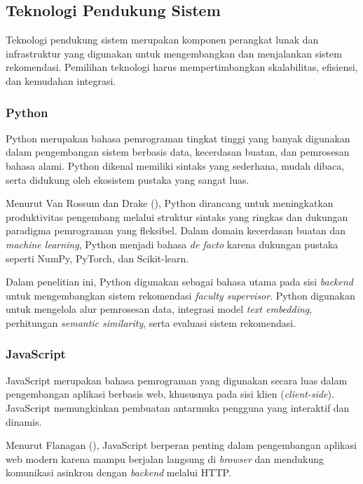 \subsection{Teknologi Pendukung Sistem}\label{teknologi-pendukung-sistem}

Teknologi pendukung sistem merupakan komponen perangkat lunak dan infrastruktur yang digunakan untuk mengembangkan dan menjalankan sistem rekomendasi. Pemilihan teknologi harus mempertimbangkan skalabilitas, efisiensi, dan kemudahan integrasi.

\subsubsection{Python}\label{python}

Python merupakan bahasa pemrograman tingkat tinggi yang banyak digunakan dalam pengembangan sistem berbasis data, kecerdasan buatan, dan pemrosesan bahasa alami. Python dikenal memiliki sintaks yang sederhana, mudah dibaca, serta didukung oleh ekosistem pustaka yang sangat luas.

Menurut Van Rossum dan Drake (\citeyear{vanrossum2009python}), Python dirancang untuk meningkatkan produktivitas pengembang melalui struktur sintaks yang ringkas dan dukungan paradigma pemrograman yang fleksibel. Dalam domain kecerdasan buatan dan \textit{machine learning}, Python menjadi bahasa \textit{de facto} karena dukungan pustaka seperti NumPy, PyTorch, dan Scikit-learn.

Dalam penelitian ini, Python digunakan sebagai bahasa utama pada sisi \textit{backend} untuk mengembangkan sistem rekomendasi \textit{faculty supervisor}. Python digunakan untuk mengelola alur pemrosesan data, integrasi model \textit{text embedding}, perhitungan \textit{semantic similarity}, serta evaluasi sistem rekomendasi.

\subsubsection{JavaScript}\label{javascript}

JavaScript merupakan bahasa pemrograman yang digunakan secara luas dalam pengembangan aplikasi berbasis web, khususnya pada sisi klien (\textit{client-side}). JavaScript memungkinkan pembuatan antarmuka pengguna yang interaktif dan dinamis.

Menurut Flanagan (\citeyear{flanagan2020javascript}), JavaScript berperan penting dalam pengembangan aplikasi web modern karena mampu berjalan langsung di \textit{browser} dan mendukung komunikasi asinkron dengan \textit{backend} melalui HTTP.

